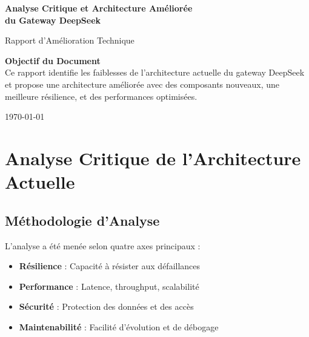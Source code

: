 \documentclass[12pt,a4paper]{article}
\begin{document}
\begin{titlepage}
    \centering
    \vspace*{2cm}
    
    {\Huge\bfseries Analyse Critique et Architecture Améliorée\\[0.5cm] du Gateway DeepSeek\par}
    \vspace{2cm}
    
    {\Large Rapport d'Amélioration Technique\par}
    \vspace{1.5cm}
    
    \begin{tcolorbox}[colback=red!5, colframe=red!50!black, width=0.8\textwidth, arc=3mm]
        \centering
        \textbf{Objectif du Document}\\[0.3cm]
        Ce rapport identifie les faiblesses de l'architecture actuelle du gateway DeepSeek et propose une architecture améliorée avec des composants nouveaux, une meilleure résilience, et des performances optimisées.
    \end{tcolorbox}
    
    \vfill
    
    {\large \today\par}
\end{titlepage}

\tableofcontents
\newpage

\section{Analyse Critique de l'Architecture Actuelle}

\subsection{Méthodologie d'Analyse}

L'analyse a été menée selon quatre axes principaux :
\begin{itemize}[noitemsep]
    \item \textbf{Résilience} : Capacité à résister aux défaillances
    \item \textbf{Performance} : Latence, throughput, scalabilité
    \item \textbf{Sécurité} : Protection des données et des accès
    \item \textbf{Maintenabilité} : Facilité d'évolution et de débogage
\end{itemize}
\end{document}
